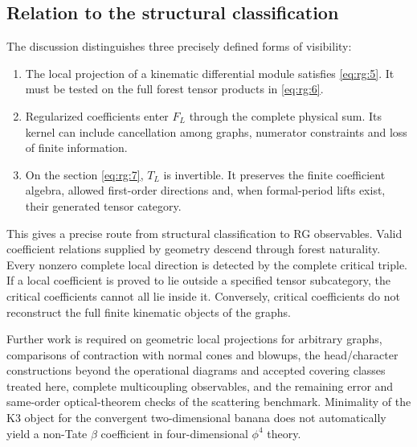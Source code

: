 \documentclass[11pt,a4paper,oneside]{article}
\theoremstyle{plain}
\theoremstyle{definition}
\theoremstyle{remark}
\newcommand{\tightlist}{\setlength{\itemsep}{0pt}\setlength{\parskip}{0pt}}
\numberwithin{equation}{section}
\begin{document}
\subsection{Relation to the structural classification}\label{sec:rg:8}
The discussion distinguishes three precisely defined forms of visibility:
\begin{enumerate}
\def\labelenumi{\arabic{enumi}.}
\tightlist
\item The local projection of a kinematic differential module satisfies \eqref{eq:rg:5}. It must be tested on the full forest tensor products in \eqref{eq:rg:6}.
\item Regularized coefficients enter $F_L$ through the complete physical sum. Its kernel can include cancellation among graphs, numerator constraints and loss of finite information.
\item On the section \eqref{eq:rg:7}, $T_L$ is invertible. It preserves the finite coefficient algebra, allowed first-order directions and, when formal-period lifts exist, their generated tensor category.
\end{enumerate}
This gives a precise route from structural classification to RG observables. Valid coefficient relations supplied by geometry descend through forest naturality. Every nonzero complete local direction is detected by the complete critical triple. If a local coefficient is proved to lie outside a specified tensor subcategory, the critical coefficients cannot all lie inside it. Conversely, critical coefficients do not reconstruct the full finite kinematic objects of the graphs.

Further work is required on geometric local projections for arbitrary graphs, comparisons of contraction with normal cones and blowups, the head/character constructions beyond the operational diagrams and accepted covering classes treated here, complete multicoupling observables, and the remaining error and same-order optical-theorem checks of the scattering benchmark. Minimality of the K3 object for the convergent two-dimensional banana does not automatically yield a non-Tate $\beta$ coefficient in four-dimensional $\phi^4$ theory.
\endgroup
\end{document}
